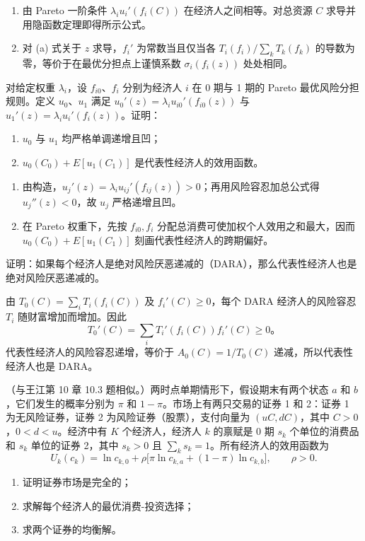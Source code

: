 \begin{solution}
\begin{enumerate}[label=(\alph*)]
\item 由 Pareto 一阶条件 $\lambda_i u_i'(f_i(C))$ 在经济人之间相等。对总资源 $C$ 求导并用隐函数定理即得所示公式。
\item 对 (a) 式关于 $z$ 求导，$f_i'$ 为常数当且仅当各 $T_i(f_i)/\sum_k T_k(f_k)$ 的导数为零，等价于在最优分担点上谨慎系数 $\sigma_i(f_i(z))$ 处处相同。
\end{enumerate}
\end{solution}
\begin{problem}
 对给定权重 $\lambda_i$，设 $f_{i0}$、$f_i$ 分别为经济人 $i$ 在 0 期与 1 期的 Pareto 最优风险分担规则。定义 $u_0$、$u_1$ 满足 $u_0'(z)=\lambda_i u_{i0}'(f_{i0}(z))$ 与 $u_1'(z)=\lambda_i u_i'(f_i(z))$。证明：
\begin{enumerate}[label=(\alph*)]
    \item $u_0$ 与 $u_1$ 均严格单调递增且凹；
    \item $u_0(C_0)+E[u_1(C_1)]$ 是代表性经济人的效用函数。
\end{enumerate}
\end{problem}
\begin{solution}
\begin{enumerate}[label=(\alph*)]
\item 由构造，$u_j'(z)=\lambda_i u_{ij}'(f_{ij}(z))>0$；再用风险容忍加总公式得 $u_j''(z)<0$，故 $u_j$ 严格递增且凹。
\item 在 Pareto 权重下，先按 $f_{i0},f_i$ 分配总消费可使加权个人效用之和最大，因而 $u_0(C_0)+E[u_1(C_1)]$ 刻画代表性经济人的跨期偏好。
\end{enumerate}
\end{solution}
\begin{problem}
 证明：如果每个经济人是绝对风险厌恶递减的（DARA），那么代表性经济人也是绝对风险厌恶递减的。
\end{problem}
\begin{solution}
由 $T_0(C)=\sum_iT_i(f_i(C))$ 及 $f_i'(C)\ge0$，每个 DARA 经济人的风险容忍 $T_i$ 随财富增加而增加。因此
\[
T_0'(C)=\sum_iT_i'(f_i(C))f_i'(C)\ge0。
\]
代表性经济人的风险容忍递增，等价于 $A_0(C)=1/T_0(C)$ 递减，所以代表性经济人也是 DARA。
\end{solution}
\begin{problem}
（与王江第 10 章 10.3 题相似。）两时点单期情形下，假设期末有两个状态 $a$ 和 $b$，它们发生的概率分别为 $\pi$ 和 $1-\pi$。市场上有两只交易的证券 1 和 2：证券 1 为无风险证券，证券 2 为风险证券（股票），支付向量为 $(uC,dC)$，其中 $C>0$，$0<d<u$。经济中有 $K$ 个经济人，经济人 $k$ 的禀赋是 0 期 $s_k$ 个单位的消费品和 $s_k$ 单位的证券 2，其中 $s_k>0$ 且 $\sum_k s_k=1$。所有经济人的效用函数为
\[
    U_k(c_k)=\ln c_{k,0}+\rho\bigl[\pi\ln c_{k,a}+(1-\pi)\ln c_{k,b}\bigr],\qquad \rho>0.
\]
\begin{enumerate}[label=(\alph*)]
    \item 证明证券市场是完全的；
    \item 求解每个经济人的最优消费-投资选择；
    \item 求两个证券的均衡解。
\end{enumerate}
\end{problem}
